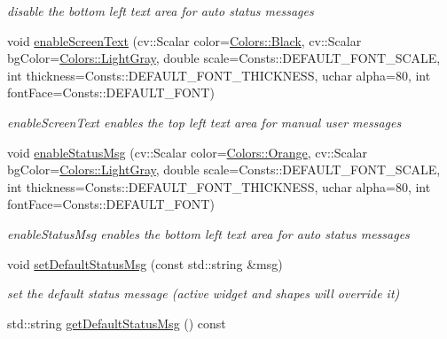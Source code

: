 \begin{DoxyCompactItemize}
\begin{DoxyCompactList}\small\item\em disable the bottom left text area for auto status messages \end{DoxyCompactList}\item 
void \hyperlink{classcanvascv_1_1Canvas_ae68d3277e738d349232400b38f0e5f9e}{enable\+Screen\+Text} (cv\+::\+Scalar color=\hyperlink{classcanvascv_1_1Colors_a934f65d826ab8b22e5bcfa6ce7816dbe}{Colors\+::\+Black}, cv\+::\+Scalar bg\+Color=\hyperlink{classcanvascv_1_1Colors_a4c2258611a1932339c02df35504f8f6d}{Colors\+::\+Light\+Gray}, double scale=Consts\+::\+D\+E\+F\+A\+U\+L\+T\+\_\+\+F\+O\+N\+T\+\_\+\+S\+C\+A\+LE, int thickness=Consts\+::\+D\+E\+F\+A\+U\+L\+T\+\_\+\+F\+O\+N\+T\+\_\+\+T\+H\+I\+C\+K\+N\+E\+SS, uchar alpha=80, int font\+Face=Consts\+::\+D\+E\+F\+A\+U\+L\+T\+\_\+\+F\+O\+NT)
\begin{DoxyCompactList}\small\item\em enable\+Screen\+Text enables the top left text area for manual user messages \end{DoxyCompactList}\item 
void \hyperlink{classcanvascv_1_1Canvas_a402c43a42c0089c48a96e5303c1c1fe8}{enable\+Status\+Msg} (cv\+::\+Scalar color=\hyperlink{classcanvascv_1_1Colors_a463fb59b35fb56e7a4eaa5976baaa411}{Colors\+::\+Orange}, cv\+::\+Scalar bg\+Color=\hyperlink{classcanvascv_1_1Colors_a4c2258611a1932339c02df35504f8f6d}{Colors\+::\+Light\+Gray}, double scale=Consts\+::\+D\+E\+F\+A\+U\+L\+T\+\_\+\+F\+O\+N\+T\+\_\+\+S\+C\+A\+LE, int thickness=Consts\+::\+D\+E\+F\+A\+U\+L\+T\+\_\+\+F\+O\+N\+T\+\_\+\+T\+H\+I\+C\+K\+N\+E\+SS, uchar alpha=80, int font\+Face=Consts\+::\+D\+E\+F\+A\+U\+L\+T\+\_\+\+F\+O\+NT)
\begin{DoxyCompactList}\small\item\em enable\+Status\+Msg enables the bottom left text area for auto status messages \end{DoxyCompactList}\item 
void \hyperlink{classcanvascv_1_1Canvas_a14828809edd29d789170284a86f16f23}{set\+Default\+Status\+Msg} (const std\+::string \&msg)\hypertarget{classcanvascv_1_1Canvas_a14828809edd29d789170284a86f16f23}{}\label{classcanvascv_1_1Canvas_a14828809edd29d789170284a86f16f23}

\begin{DoxyCompactList}\small\item\em set the default status message (active widget and shapes will override it) \end{DoxyCompactList}\item 
std\+::string \hyperlink{classcanvascv_1_1Canvas_a020df071c9ef8dd6a0582accb75553df}{get\+Default\+Status\+Msg} () const \hypertarget{classcanvascv_1_1Canvas_a020df071c9ef8dd6a0582accb75553df}{}\label{classcanvascv_1_1Canvas_a020df071c9ef8dd6a0582accb75553df}


\end{DoxyCompactItemize}
